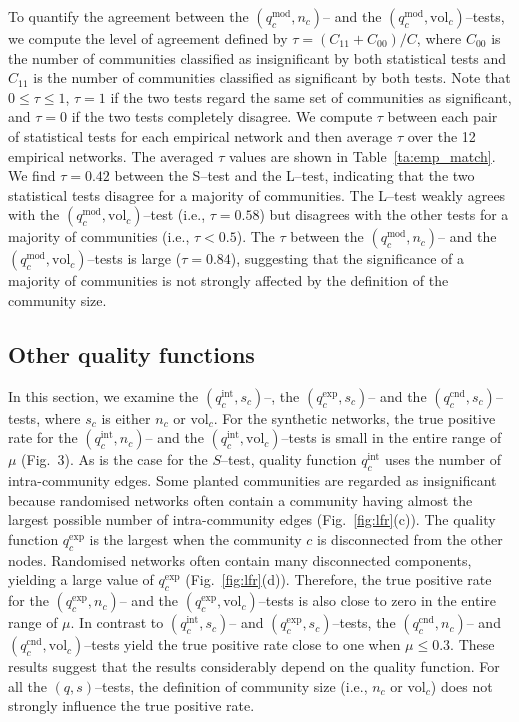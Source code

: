 \documentclass[fleqn,10pt]{wlscirep}
\def\qmod{q^{\text{mod}}}
\def\qint{q^{\text{int}}}
\def\qexp{q^{\text{exp}}}
\def\qcnd{q^{\text{cnd}}}
\def\vol{\text{vol}}
\begin{document}
To quantify the agreement between the $(\qmod_c, n_c)$-- and the $(\qmod_c, \vol_c)$--tests,
we compute the level of agreement defined by $\tau=(C_{11} + C_{00}) / C$, where $C_{00}$ is the number of communities classified as insignificant by both statistical tests and $C_{11}$ is the number of communities classified as significant by both tests.
Note that $0 \leq \tau \leq 1$, $\tau = 1$ if the two tests regard the same set of communities as significant, and $\tau=0$ if the two tests completely disagree.
We compute $\tau$ between each pair of statistical tests for each empirical network and then average $\tau$ over the 12 empirical networks. 
The averaged $\tau$ values are shown in Table~\ref{ta:emp_match}.
We find $\tau=0.42$ between the S--test and the L--test, indicating that the two statistical tests disagree for a majority of communities.
The L--test weakly agrees with the $(\qmod_c, \vol_c)$--test (i.e., $\tau = 0.58$) but disagrees with the other tests for a majority of communities (i.e., $\tau < 0.5$). 
The $\tau$ between the $(\qmod_c, n_c)$-- and the $(\qmod_c, \vol_c)$--tests is large ($\tau=0.84$), suggesting that the significance of a majority of communities is not strongly affected by the definition of the community size.


\subsection{Other quality functions}
\label{sec:other_quality_functions}
In this section, we examine the $(\qint_c, s_c)$--, the $(\qexp_c, s_c)$-- and the $(\qcnd_c, s_c)$--tests, where $s_c$ is either $n_c$ or $\vol_c$.
For the synthetic networks, the true positive rate for the $(\qint_c, n_c)$-- and the $(\qint_c, \vol_c)$--tests is small in the entire range of $\mu$ (Fig.~3).
As is the case for the $S$--test, quality function $\qint_c$ uses the number of intra-community edges.
Some planted communities are regarded as insignificant because randomised networks often contain a community having almost the largest possible number of intra-community edges (Fig.~\ref{fig:lfr}(c)).
The quality function $\qexp_c$ is the largest when the community $c$ is disconnected from the other nodes.
Randomised networks often contain many disconnected components, yielding a large value of $\qexp_c$ (Fig.~\ref{fig:lfr}(d)).
Therefore, the true positive rate for the $(\qexp_c, n_c)$-- and the $(\qexp_c, \vol_c)$--tests is also close to zero in the entire range of $\mu$.
In contrast to $(\qint_c, s_c)$-- and $(\qexp_c, s_c)$--tests, the $(\qcnd_c, n_c)$-- and $(\qcnd_c, \vol_c)$--tests yield the true positive rate close to one when $\mu \leq 0.3$.
These results suggest that the results considerably depend on the quality function. 
For all the $(q,s)$--tests, the definition of community size (i.e., $n_c$ or $\vol_c$) does not strongly influence the true positive rate.
\end{document}
